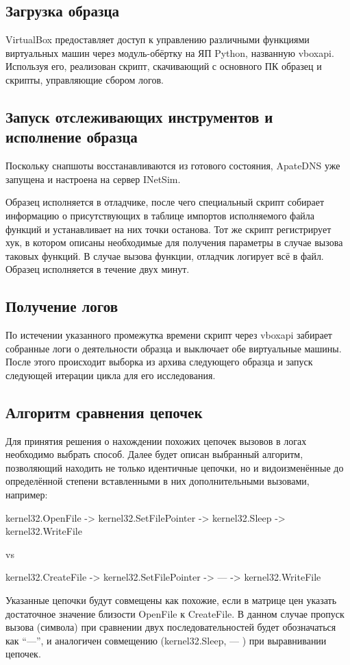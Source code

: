 \subsection {Загрузка образца}
VirtualBox предоставляет доступ к управлению различными функциями виртуальных машин через модуль-обёртку на ЯП Python, названную vboxapi. Используя его, реализован скрипт, скачивающий с основного ПК образец и скрипты, управляющие сбором логов.
\subsection {Запуск отслеживающих инструментов и исполнение образца}
Поскольку снапшоты восстанавливаются из готового состояния, ApateDNS уже запущена и настроена на сервер INetSim.

Образец исполняется в отладчике, после чего специальный скрипт собирает информацию о присутствующих в таблице импортов исполняемого файла функций и устанавливает на них точки останова. Тот же скрипт регистрирует хук, в котором описаны необходимые для получения параметры в случае вызова таковых функций.
В случае вызова функции, отладчик логирует всё в файл. Образец исполняется в течение двух минут.
\subsection {Получение логов}
По истечении указанного промежутка времени скрипт через vboxapi забирает собранные логи о деятельности образца и выключает обе виртуальные машины. После этого происходит выборка из архива следующего образца и запуск следующей итерации цикла для его исследования.

\subsection {Алгоритм сравнения цепочек}
 Для принятия решения о нахождении похожих цепочек вызовов в логах необходимо выбрать способ. Далее будет описан выбранный алгоритм, позволяющий находить не только идентичные цепочки, но и видоизменённые до определённой степени вставленными в них дополнительными вызовами, например:

kernel32.OpenFile -> kernel32.SetFilePointer -> kernel32.Sleep -> kernel32.WriteFile

vs

kernel32.CreateFile -> kernel32.SetFilePointer -> ---  ->   kernel32.WriteFile

Указанные цепочки будут совмещены как похожие, если в матрице цен указать достаточное значение близости OpenFile к CreateFile.
В данном случае пропуск  вызова (символа) при сравнении двух последовательностей будет обозначаться как ``---'', и аналогичен совмещению (kernel32.Sleep, --- ) при выравнивании цепочек.
